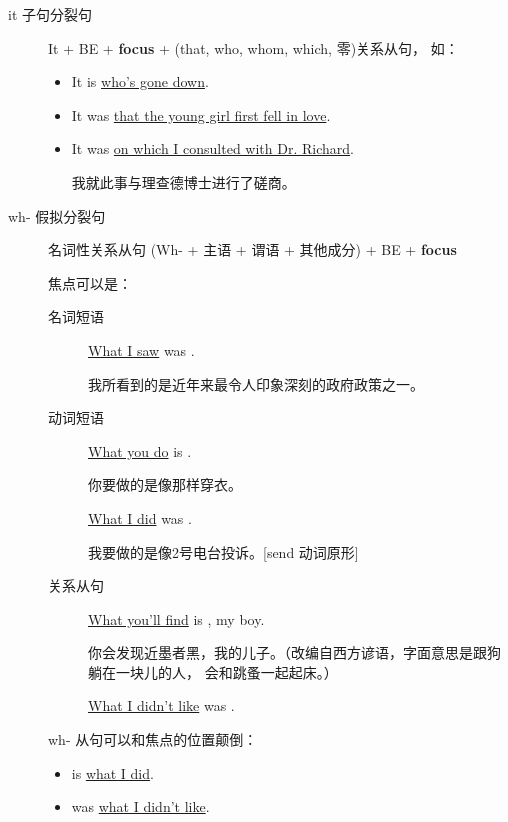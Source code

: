 \begin{description}
\item[it 子句分裂句] It + BE + \textbf{focus} + (that, who, whom, which, 零)关系从句，
  如：
  \begin{itemize}
  \item It is  \uline{who’s gone down}.

  \item It was  \uline{that the young girl first fell in love}.


  \item It was  \uline{on which I consulted with Dr. Richard}.

    我就此事与理查德博士进行了磋商。
  \end{itemize}


\item[wh- 假拟分裂句] 名词性关系从句 (Wh- + 主语 + 谓语 + 其他成分) + BE + \textbf{focus}

  焦点可以是：
  \begin{description}
  \item[名词短语] \uline{What I saw} was .

    我所看到的是近年来最令人印象深刻的政府政策之一。
  \item[动词短语] \uline{What you do} is .

    你要做的是像那样穿衣。

   \uline{What I did} was .

   我要做的是像2号电台投诉。[send 动词原形]

 \item[关系从句]
   \uline{What you’ll find} is , my boy.

   你会发现近墨者黑，我的儿子。（改编自西方谚语，字面意思是跟狗躺在一块儿的人，
   会和跳蚤一起起床。）

   \uline{What I didn’t like} was .

  \end{description}

  wh- 从句可以和焦点的位置颠倒：
  \begin{itemize}
  \item {} is \uline{what I did}.

  \item {} was \uline{what I didn’t like}.
  \end{itemize}
\end{description}

